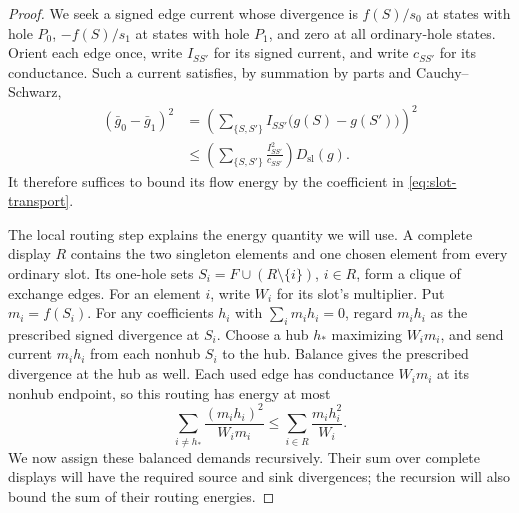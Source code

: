 \begin{proof}
We seek a signed edge current whose divergence is $f(S)/s_0$ at
states with hole $P_0$, $-f(S)/s_1$ at states with hole $P_1$, and zero
at all ordinary-hole states. Orient each edge once, write $I_{SS'}$
for its signed current, and write $c_{SS'}$ for its conductance.
Such a current satisfies, by summation by parts and Cauchy--Schwarz,
\begin{equation}
 \begin{split}
  (\bar g_0-\bar g_1)^2
   &=\left(\sum_{\{S,S'\}}
                 I_{SS'}\bigl(g(S)-g(S')\bigr)\right)^2\\
   &\leq
      \left(\sum_{\{S,S'\}}\frac{I_{SS'}^2}{c_{SS'}}\right)
      D_{\mathrm{sl}}(g).
 \end{split}
 \label{eq:transport-flow-criterion}
\end{equation}
It therefore suffices to bound its flow energy by the coefficient in
\eqref{eq:slot-transport}.

The local routing step explains the energy quantity we will use.
A complete display $R$ contains the two singleton elements and one
chosen element from every ordinary slot. Its one-hole sets
$S_i=F\cup(R\setminus\{i\})$, $i\in R$, form a clique of exchange
edges. For an element $i$, write $W_i$ for its slot's multiplier.
Put $m_i=f(S_i)$. For any coefficients $h_i$ with
$\sum_i m_i h_i=0$, regard $m_i h_i$ as the prescribed signed
divergence at $S_i$. Choose a hub $h_*$ maximizing $W_i m_i$, and
send current $m_i h_i$ from each nonhub $S_i$ to the hub. Balance gives
the prescribed divergence at the hub as well. Each used edge has
conductance $W_i m_i$ at its nonhub endpoint, so this routing has
energy at most
\[
 \sum_{i\ne h_*}\frac{(m_i h_i)^2}{W_i m_i}
 \leq\sum_{i\in R}\frac{m_i h_i^2}{W_i}.
\]
We now assign these balanced demands recursively. Their sum over
complete displays will have the required source and sink divergences;
the recursion will also bound the sum of their routing energies.


\end{proof}
